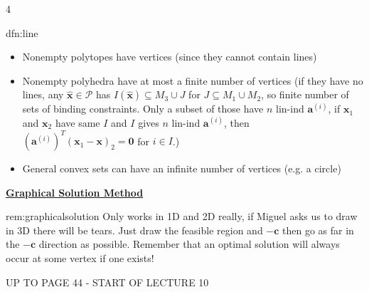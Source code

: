 \documentclass[landscape, 8pt]{extarticle}
\begin{document}
\begin{multicols*}{4}
\begin{dfn}[Lines]{dfn:line}{ }
\begin{itemize}
				\item Nonempty polytopes have vertices (since they cannot contain lines)
				\item Nonempty polyhedra have at most a finite number of vertices (if they have no lines, any $\mathbf{\hat{x}}\in \mathcal{P}$ has $I(\mathbf{\hat{x}}) \subseteq M_3 \cup J$ for $J \subseteq M_1 \cup M_2$, so finite number of sets of binding constraints. Only a subset of those have $n$ lin-ind $\mathbf{a}^{(i)}$, if $\mathbf{x}_1$ and $\mathbf{x}_2$ have same $I$ and $I$ gives $n$ lin-ind $\mathbf{a}^{(i)}$, then $(\mathbf{a}^{(i)})^T(\mathbf{x}_1 - \mathbf{x})_2 = \mathbf{0}$ for $i\in I$.)
				\item General convex sets can have an infinite number of vertices (e.g. a circle)
			\end{itemize}
			
		\end{dfn}
		
		
		{\tiny\textbf{\underline{Graphical Solution Method}}}
		
		
		\begin{rem}{rem:graphicalsolution}{ }
			Only works in 1D and 2D really, if Miguel asks us to draw in 3D there will be tears. Just draw the feasible region and $-\mathbf{c}$ then go as far in the $-\mathbf{c}$ direction as possible. Remember that an optimal solution will always occur at some vertex if one exists! 
			
		\end{rem}
		
		
		
		
		UP TO PAGE 44 - START OF LECTURE 10
		
		
\end{multicols*}	
	
\end{document}

